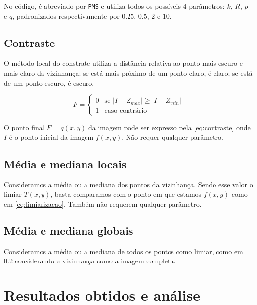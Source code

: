 \documentclass[brazilian,a4paper,twocolumn]{article}
\begin{document}
        No código, é abreviado por \texttt{PMS} e utiliza todos os possíveis 4 parâmetros: $k$, $R$, $p$ e $q$, padronizados respectivamente por $0.25$, $0.5$, $2$ e $10$.

    \subsection{Contraste}

        O método local do constrate utiliza a distância relativa ao ponto mais escuro e mais claro da vizinhança: se está mais próximo de um ponto claro, é claro; se está de um ponto escuro, é escuro.

        \begin{equation}
        \label{eq:contraste}
            F =
            \begin{cases}
                0       & \text{se $\mathopen|I - Z_{max}\mathclose| \geq \mathopen|I - Z_{min}\mathclose|$} \\
                1       & \text{caso contrário}
            \end{cases}
        \end{equation}

        O ponto final $F = g(x, y)$ da imagem pode ser expresso pela \cref{eq:contraste} onde $I$ é o ponto inicial da imagem $f(x, y)$. Não requer qualquer parâmetro.

    \subsection{Média e mediana locais}
    \label{sec:media-mediana-locais}

        Consideramos a média ou a mediana dos pontos da vizinhança. Sendo esse valor o limiar $T(x, y)$, basta comparamos com o ponto em que estamos $f(x, y)$ como em \cref{eq:limiarizacao}. Também não requerem qualquer parâmetro.

    \subsection{Média e mediana globais}

        Consideramos a média ou a mediana de todos os pontos como limiar, como em \ref{sec:media-mediana-locais} considerando a vizinhança como a imagem completa.


\section{Resultados obtidos e análise}
\end{document}
